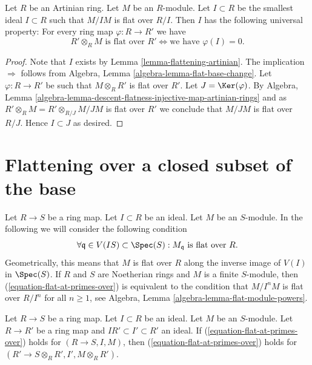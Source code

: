 \begin{lemma}
\label{lemma-flattening-artinian-universal-property}
Let $R$ be an Artinian ring. Let $M$ be an $R$-module.
Let $I \subset R$ be the smallest ideal $I \subset R$ such that
$M/IM$ is flat over $R/I$.
Then $I$ has the following universal property:
For every ring map $\varphi : R \to R'$ we have
$$
R' \otimes_R M\text{ is flat over }R'
\Leftrightarrow
\text{we have }\varphi(I) = 0.
$$
\end{lemma}

\begin{proof}
Note that $I$ exists by
Lemma \ref{lemma-flattening-artinian}.
The implication $\Rightarrow$ follows from
Algebra, Lemma \ref{algebra-lemma-flat-base-change}.
Let $\varphi : R \to R'$ be such that $M \otimes_R R'$ is flat over $R'$.
Let $J = \Ker(\varphi)$. By
Algebra,
Lemma \ref{algebra-lemma-descent-flatness-injective-map-artinian-rings}
and as $R' \otimes_R M = R' \otimes_{R/J} M/JM$ is
flat over $R'$ we conclude that $M/JM$ is flat over $R/J$.
Hence $I \subset J$ as desired.
\end{proof}











\section{Flattening over a closed subset of the base}
\label{section-flattening-local-base}

\noindent
Let $R \to S$ be a ring map.
Let $I \subset R$ be an ideal.
Let $M$ be an $S$-module.
In the following we will consider the following condition
\begin{equation}
\label{equation-flat-at-primes-over}
\forall \mathfrak q \in V(IS) \subset \Spec(S) :
M_{\mathfrak q}\text{ is flat over }R.
\end{equation}
Geometrically, this means that $M$ is flat over $R$ along the inverse
image of $V(I)$ in $\Spec(S)$. If $R$ and $S$ are Noetherian rings and
$M$ is a finite $S$-module, then (\ref{equation-flat-at-primes-over})
is equivalent to the condition that $M/I^nM$ is flat over $R/I^n$
for all $n \geq 1$, see
Algebra, Lemma \ref{algebra-lemma-flat-module-powers}.

\begin{lemma}
\label{lemma-base-change-flat-at-primes-over}
Let $R \to S$ be a ring map.
Let $I \subset R$ be an ideal.
Let $M$ be an $S$-module.
Let $R \to R'$ be a ring map and $IR' \subset I' \subset R'$ an ideal.
If (\ref{equation-flat-at-primes-over}) holds for
$(R \to S, I, M)$, then (\ref{equation-flat-at-primes-over})
holds for $(R' \to S \otimes_R R', I', M \otimes_R R')$.
\end{lemma}


